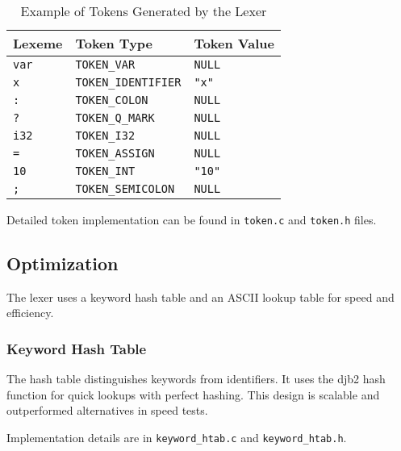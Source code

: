 \documentclass[12pt,a4paper]{article}
\begin{document}
\begin{table}[h!]
\centering
\setlength{\arrayrulewidth}{0.2mm} %
\setlength{\tabcolsep}{6pt} %
\renewcommand{\arraystretch}{1.3} %
\begin{tabular}{|p{3cm}|p{5cm}|p{4cm}|} %
\hline
\textbf{Lexeme} & \textbf{Token Type} & \textbf{Token Value} \\ \hline
\texttt{var}    & \texttt{TOKEN\_VAR}          & \texttt{NULL}         \\ \hline
\texttt{x}      & \texttt{TOKEN\_IDENTIFIER}   & \texttt{"x"}          \\ \hline
\texttt{:}      & \texttt{TOKEN\_COLON}        & \texttt{NULL}         \\ \hline
\texttt{?}      & \texttt{TOKEN\_Q\_MARK}      & \texttt{NULL}         \\ \hline
\texttt{i32}    & \texttt{TOKEN\_I32}          & \texttt{NULL}         \\ \hline
\texttt{=}      & \texttt{TOKEN\_ASSIGN}       & \texttt{NULL}         \\ \hline
\texttt{10}     & \texttt{TOKEN\_INT}          & \texttt{"10"}         \\ \hline
\texttt{;}      & \texttt{TOKEN\_SEMICOLON}    & \texttt{NULL}         \\ \hline
\end{tabular}
\caption{Example of Tokens Generated by the Lexer}
\label{table:tokens}
\end{table}

Detailed token implementation can be found in \texttt{token.c} and \texttt{token.h} files.

\subsection{Optimization}
The lexer uses a keyword hash table and an ASCII lookup table for speed and efficiency.

\subsubsection{Keyword Hash Table}
The hash table distinguishes keywords from identifiers. It uses the djb2 hash function for quick lookups with perfect hashing. This design is scalable and outperformed alternatives in speed tests. 

Implementation details are in \texttt{keyword\_htab.c} and \texttt{keyword\_htab.h}.
\end{document}
